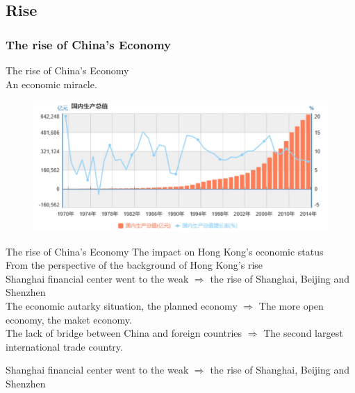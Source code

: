\documentclass[slidestop,uncompress,mathsans, 12pt]{beamer}
\begin{document}
\subsection{Rise}
\begin{frame}
\frametitle{The rise of China's Economy}
The rise of China's Economy\\
An economic miracle.\\
\bigskip
\begin{figure}[h!]
\centering
\includegraphics[width=1\textwidth]{hk8.jpg}
\label{threadsVsSync}
\end{figure}
\end{frame}


\begin{frame}{The rise of China's Economy}
The impact on Hong Kong's economic status\\
\bigskip
From the perspective of the background of Hong Kong's rise\\
\bigskip
\bigskip
Shanghai financial center went to the weak
$\Longrightarrow$ the rise of Shanghai, Beijing and Shenzhen\\
\bigskip
\bigskip
The economic autarky situation, the planned economy
$\Longrightarrow$ The more open economy, the maket economy.\\
\bigskip
\bigskip
The lack of bridge between China and foreign countries
$\Longrightarrow$ The second largest international trade country.\\
 



\end{frame}
\begin{frame}
\bigskip
\bigskip
\bigskip
\bigskip
\bigskip
\bigskip
\bigskip
\bigskip
Shanghai financial center went to the weak
$\Longrightarrow$ the rise of Shanghai, Beijing and Shenzhen\\
\bigskip
\bigskip
\end{frame}
\end{document}
